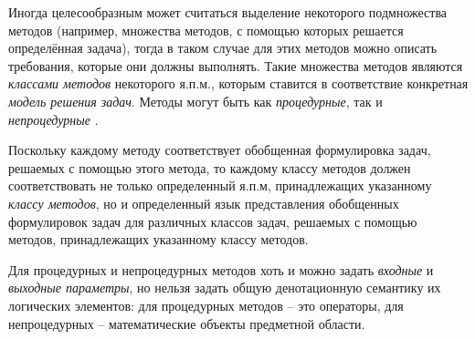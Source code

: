 Иногда целесообразным может считаться выделение некоторого подмножества методов (например, множества методов, с помощью которых решается определённая задача), тогда в таком случае для этих методов можно описать требования, которые они должны выполнять. Такие множества методов являются \textit{классами методов} некоторого я.п.м., которым ставится в соответствие конкретная \textit{модель решения задач}. Методы могут быть как \textit{процедурные}, так и \textit{непроцедурные} \cite{Turner2007}.

\begin{SCn}
\begin{scnindent}
\end{scnindent}
\begin{scnindent}
    \begin{scnindent}
    \end{scnindent}
\end{scnindent}
\end{SCn}

Поскольку каждому методу соответствует обобщенная формулировка задач, решаемых с помощью этого метода, то каждому классу методов должен соответствовать не только определенный я.п.м, принадлежащих указанному \textit{классу методов}, но и определенный язык представления обобщенных формулировок задач для различных классов задач, решаемых с помощью методов, принадлежащих указанному классу методов.

Для процедурных и непроцедурных методов хоть и можно задать \textit{входные} и \textit{выходные параметры}, но нельзя задать общую денотационную семантику их логических элементов: для процедурных методов -- это операторы, для непроцедурных -- математические объекты предметной области.

